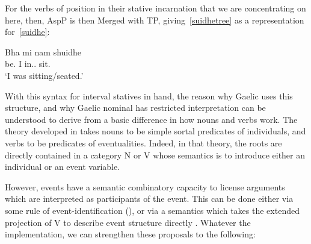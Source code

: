 \documentclass[output=paper]{langsci/langscibook}
\begin{document}
For the verbs of position in their stative incarnation that we are
concentrating on here, then, AspP is then Merged with TP,
giving~\eqref{suidhetree} as a representation for~\eqref{suidhe}:

\ea {} \label{suidhe}
\sn \gll  Bha mi nam shuidhe\\
be.\Pst{} I in.\Poss.\Fsg{} sit.\Vn{}\\
\glt \enquote*{I was sitting/seated.}
\z

\ea \label{suidhetree}
\z
With this syntax for interval statives in hand, the reason why Gaelic uses this
structure, and why Gaelic nominal  has restricted interpretation can
be understood to derive from a basic difference in how nouns and verbs work.
The theory developed in \citet{adgerbook} takes nouns to be simple sortal
predicates of individuals, and verbs to be predicates of eventualities. Indeed,
in that theory, the roots are directly contained in a category N or V whose
semantics is to introduce either an individual or an event variable.

{\sloppy
However, events have a semantic combinatory capacity to license arguments which
are interpreted as participants of the event. This can be done either via some
rule of event-identification (\citealt{kratzer96}), or via a semantics which
takes the extended projection of V to describe event structure
directly \parencite{ramchand08}. Whatever the implementation, we can strengthen
these proposals to the following:}
\end{document}
